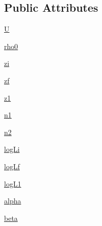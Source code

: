\subsection*{Public Attributes}
\begin{DoxyCompactItemize}
\item 
\hyperlink{classgrbsim_1_1_population_a142257ab80688d2ce937e9fc8e960e96}{U}
\item 
\hyperlink{classgrbsim_1_1_population_aa7e089ed973dfa3c856e9e2dc67cae48}{rho0}
\item 
\hyperlink{classgrbsim_1_1_population_a7780a80e30452b2a4682f7b6f2bf0d18}{zi}
\item 
\hyperlink{classgrbsim_1_1_population_ac6613ab254b2366c6fac7ba50e4734d7}{zf}
\item 
\hyperlink{classgrbsim_1_1_population_a2d1535d9af34a3e9355d05734e1d7c94}{z1}
\item 
\hyperlink{classgrbsim_1_1_population_a3e5dfa08846efa032f7ee66857b82b3b}{n1}
\item 
\hyperlink{classgrbsim_1_1_population_a459454cd1bb014924b82cbbce9403cca}{n2}
\item 
\hyperlink{classgrbsim_1_1_population_a33509f2091acc42103779d166c3a370c}{log\-Li}
\item 
\hyperlink{classgrbsim_1_1_population_ac24d080c569dfa5f4981ce019d17ad1a}{log\-Lf}
\item 
\hyperlink{classgrbsim_1_1_population_a9b9c750e6828e4ed66d6a052f8159a1c}{log\-L1}
\item 
\hyperlink{classgrbsim_1_1_population_a3bd729ea7c1a389c8d6377506e2de622}{alpha}
\item 
\hyperlink{classgrbsim_1_1_population_ae00d66b8505071bc2d0c9e9dee32223c}{beta}
\end{DoxyCompactItemize}


